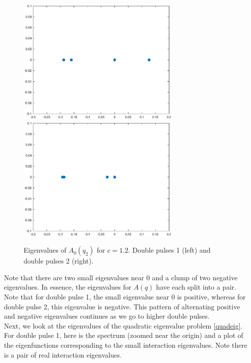 \documentclass[12pt]{article}
\begin{document}
\begin{figure}[H]
\centering
\includegraphics[width=8cm]{specA0d1}
\includegraphics[width=8cm]{specA0d2}
\caption{Eigenvalues of $A_0(q_2)$ for $c = 1.2$. Double pulses 1 (left) and double pulses 2 (right).}
\end{figure}

Note that there are two small eigenvalues near 0 and a clump of two negative eigenvalues. In essence, the eigenvalues for $A(q)$ have each split into a pair. Note that for double pulse 1, the small eigenvalue near 0 is positive, whereas for double pulse 2, this eigenvalue is negative. This pattern of alternating positive and negative eigenvalues continues as we go to higher double pulses.\\

Next, we look at the eigenvalues of the quadratic eigenvalue problem \eqref{quadeig}. For double pulse 1, here is the spectrum (zoomed near the origin) and a plot of the eigenfunctions corresponding to the small interaction eigenvalues. Note there is a pair of real interaction eigenvalues.
\end{document}
